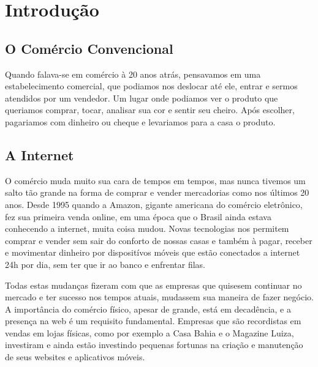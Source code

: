 \documentclass[
	12pt,				%
    oneside,			%
	a4paper,			%
	english,			%
	french,				%
	spanish,			%
	brazil				%
	]{abntex2}
\begin{document}
\tableofcontents*
\clearpage

\textual

\chapter{Introdução}

\section{O Comércio Convencional}

Quando falava-se em comércio à 20 anos atrás, pensavamos em uma estabelecimento comercial, que podiamos nos deslocar até ele, entrar e sermos atendidos por um vendedor. Um lugar onde podiamos ver o produto que queriamos comprar, tocar, analisar sua cor e sentir seu cheiro. Após escolher, pagariamos com dinheiro ou cheque e levariamos para a casa o produto.


\section{A Internet}

O comércio muda muito sua cara de tempos em tempos, mas nunca tivemos um salto tão grande na forma de comprar e vender mercadorias como nos últimos 20 anos. Desde 1995 quando a Amazon, gigante americana do comércio eletrônico, fez sua primeira venda online, em uma época que o Brasil ainda estava conhecendo a internet, muita coisa mudou. Novas tecnologias nos permitem comprar e vender sem sair do conforto de nossas casas e também à pagar, receber e movimentar dinheiro por dispositívos móveis que estão conectados a internet 24h por dia, sem ter que ir ao banco e enfrentar filas.

Todas estas mudanças fizeram com que as empresas que quisesem continuar no mercado e ter sucesso nos tempos atuais, mudassem sua maneira de fazer negócio. A importância do comércio físico, apesar de grande, está em decadência, e a presença na web é um requisito fundamental. Empresas que são recordistas em vendas em lojas físicas, como por exemplo a Casa Bahia e o Magazine Luiza, investiram e ainda estão investindo pequenas fortunas na criação e manutenção de seus websites e aplicativos móveis.
\end{document}
